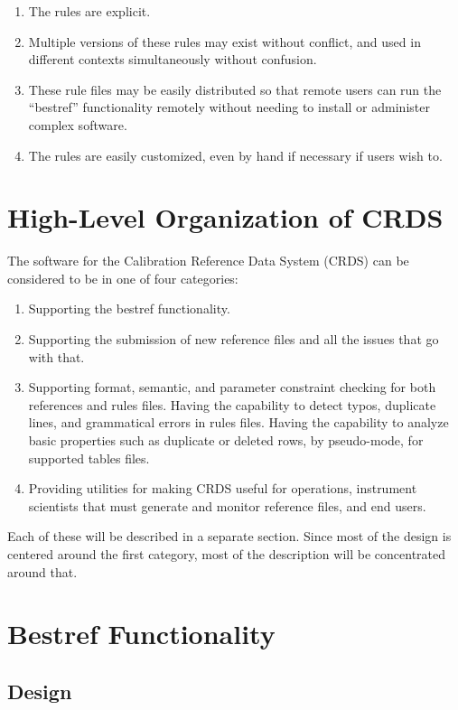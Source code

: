 \documentclass[final,authoryear,5p,times,twocolumn]{elsarticle}
\begin{document}
\begin{enumerate}
\item The rules are explicit.
\item Multiple versions of these rules may exist without conflict, and used in
different contexts simultaneously without confusion.
\item These rule files may be easily distributed so that remote users can run the
``bestref'' functionality remotely without needing to install or administer
complex software.
\item The rules are easily customized, even by hand if necessary if
users wish to.
\end{enumerate}

\section{High-Level Organization of CRDS}

The software for the Calibration Reference Data System (CRDS) 
can be considered to be in one of four categories:

\begin{enumerate}
\item Supporting the bestref functionality.
\item Supporting the submission of new reference files and all the issues that
go with that.
\item Supporting format, semantic, and parameter constraint checking for both
references and rules files.  Having the capability to detect typos, duplicate 
lines, and grammatical errors in rules files. 
Having the capability to analyze basic properties
such as duplicate or deleted rows,  by pseudo-mode, for supported tables files.
\item Providing utilities for making CRDS useful for operations, instrument
scientists that must generate and monitor reference files, and end users.
\end{enumerate}

Each of these will be described in a separate section. Since most of the design
is centered around the first category, most of the description will be concentrated
around that.

\section{Bestref Functionality}

\subsection{Design}
\end{document}
